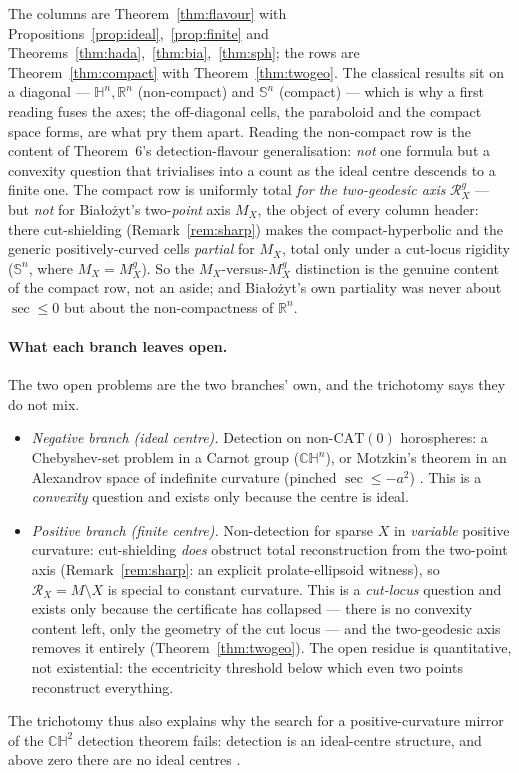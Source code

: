 \documentclass[11pt]{article}
\theoremstyle{remark}
\newcommand{\R}{\mathbb{R}}
\newcommand{\X}{X}
\newcommand{\Mx}{M_{\X}}
\newcommand{\Rx}{\mathcal{R}_{\X}}
\newcommand{\sect}{\operatorname{sec}}
\newcommand{\HH}{\mathbb{H}}
\newcommand{\CH}{\mathbb{CH}}
\newcommand{\Sn}{\mathbb{S}^{n}}
\begin{document}
\noindent The columns are Theorem~\ref{thm:flavour} with
Propositions~\ref{prop:ideal},~\ref{prop:finite} and
Theorems~\ref{thm:hada},~\ref{thm:bia},~\ref{thm:sph}; the rows are
Theorem~\ref{thm:compact} with Theorem~\ref{thm:twogeo}. The classical
results sit on a diagonal --- $\HH^{n},\R^{n}$ (non-compact) and $\Sn$
(compact) --- which is why a first reading fuses the axes; the off-diagonal
cells, the paraboloid and the compact space forms, are what pry them apart.
Reading the non-compact row is the content of Theorem~6's
detection-flavour generalisation: \emph{not} one formula but a convexity
question that trivialises into a count as the ideal centre descends to a
finite one. The compact row is uniformly total \emph{for the two-geodesic
axis} $\Rx^{g}$ --- but \emph{not} for Bia\l{}o\.zyt's two-\emph{point}
axis $\Mx$, the object of every column header: there cut-shielding
(Remark~\ref{rem:sharp}) makes the compact-hyperbolic and the generic
positively-curved cells \emph{partial} for $\Mx$, total only under a
cut-locus rigidity ($\Sn$, where $\Mx=\Mx^{g}$). So the $\Mx$-versus-$\Mx^{g}$
distinction is the genuine content of the compact row, not an aside; and
Bia\l{}o\.zyt's own partiality was never about $\sect\le0$ but about the
non-compactness of $\R^{n}$.

\paragraph{What each branch leaves open.} The two open problems are the two
branches' own, and the trichotomy says they do not mix.
\begin{itemize}
\item \emph{Negative branch (ideal centre).} Detection on
non-$\mathrm{CAT}(0)$ horospheres: a Chebyshev-set problem in a Carnot
group ($\CH^{n}$), or Motzkin's theorem in an Alexandrov space of
indefinite curvature (pinched $\sect\le-a^{2}$) \cite[\S10]{R3}. This is a
\emph{convexity} question and exists only because the centre is ideal.
\item \emph{Positive branch (finite centre).} Non-detection for sparse
$\X$ in \emph{variable} positive curvature: cut-shielding \emph{does}
obstruct total reconstruction from the two-point axis
(Remark~\ref{rem:sharp}: an explicit prolate-ellipsoid witness), so
$\Rx=M\setminus\X$ is special to constant curvature. This is a
\emph{cut-locus} question and exists only because the certificate has
collapsed --- there is no convexity content left, only the geometry of
the cut locus --- and the two-geodesic axis removes it entirely
(Theorem~\ref{thm:twogeo}). The open residue is quantitative, not
existential: the eccentricity threshold below which even two points
reconstruct everything.
\end{itemize}
The trichotomy thus also explains why the search for a positive-curvature
mirror of the $\CH^{2}$ detection theorem fails: detection is an
ideal-centre structure, and above zero there are no ideal centres
\cite[Thm.~3.4]{Sph}.
\end{document}
